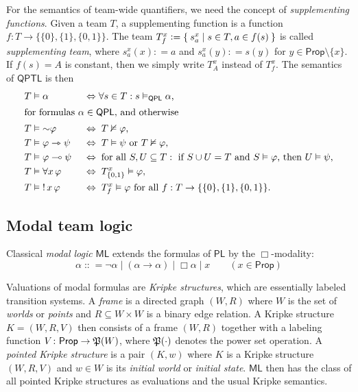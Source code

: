 \documentclass[a4paper,english,fleqn,11pt,final]{scrartcl}
\newcommand{\pow}[1]{{\protect\ensuremath{\mathord{\mathfrak{P}(\nobreak#1\nobreak)}}}}
\newcommand{\negg}{{\sim}}
\newcommand{\logic}[1]{\ensuremath{\mathsf{#1}}\xspace}
\newcommand{\PS}{\logic{Prop}}
\newcommand{\PL}{\logic{PL}}
\newcommand{\QPL}{\logic{QPL}}
\newcommand{\ML}{\logic{ML}}
\newcommand{\QPTL}{\logic{QPTL}}
\providecommand{\dfn}{\mathrel{\mathop:}=}
\providecommand{\ddfn}{\mathrel{\mathop{{\mathop:}{\mathop:}}}=}
\newcommand{\imp}{\rightarrow}
\newcommand{\limp}{\multimap}
\newcommand{\timp}{\rightarrowtriangle}
\DeclareMathOperator{\shriek}{!}
\theoremstyle{plain}
\theoremstyle{definition}
\begin{document}
For the semantics of team-wide quantifiers, we need the concept of \emph{supplementing functions}.
Given a team $T$, a supplementing function is a function $f \colon T \to \{\{0\},\{1\},\{0,1\}\}$.
The team $T^x_f \dfn \Set{ s^x_a | s \in T, a \in f(s)}$ is called \emph{supplementing team},
where $s^x_a(x) \dfn a$ and $s^x_a(y) \dfn s(y)$ for $y \in \PS \setminus \{ x\}$.
If $f(s) = A$ is constant, then we simply write $T^x_A$ instead of $T^x_f$.
\label{p:semantics}
The semantics of $\QPTL$ is then
\begin{alignat*}{2}
    &T \vDash \alpha&& \Leftrightarrow \forall s \in T : s \vDash_{\QPL} \alpha\text{,}\\
\intertext{for formulas $\alpha \in \QPL$, and otherwise}
    &T \vDash \negg\varphi&&\Leftrightarrow\; T \nvDash \varphi\text{,}\\
    &T \vDash \varphi \timp \psi&&\Leftrightarrow\; T \vDash \psi \text{ or }T\nvDash \varphi\text{,}\\
    &T \vDash \varphi \limp \psi\;&&\Leftrightarrow\; \text{for all } S, U \subseteq T : \text{ if }S \cup U = T \text{ and }S \vDash \varphi \text{, then }U \vDash \psi\text{,}\\
    &T \vDash \forall x \,\varphi &&\Leftrightarrow\; T^x_{\{0,1\}} \vDash \varphi \text{,}\\
    &T \vDash \shriek x \, \varphi &&\Leftrightarrow\; T^x_{f} \vDash \varphi \text{ for all  }f : T \to \{\{0\},\{1\},\{0,1\}\}\text{.}
\end{alignat*}

\subsection{Modal team logic}

Classical \emph{modal logic} $\ML$ extends the formulas of $\PL$ by the $\Box$-modality:
\[
\alpha \ddfn \neg \alpha \mid (\alpha \imp \alpha) \mid \Box \alpha \mid x \qquad (x \in \PS)
\]


Valuations of modal formulas are \emph{Kripke structures}, which are essentially labeled transition systems.
A \emph{frame} is a directed graph $(W, R)$ where $W$ is the set of \emph{worlds} or \emph{points} and $R \subseteq W \times W$ is a binary edge relation.
A Kripke structure $K = (W,R,V)$ then consists of a frame $(W,R)$ together with a labeling function $V \colon \PS \to \pow{W}$, where $\pow{\cdot}$ denotes the power set operation.
A \emph{pointed Kripke structure} is a pair $(K,w)$ where $K$ is a Kripke structure $(W,R,V)$ and $w \in W$ is its \emph{initial world} or \emph{initial state}.
$\ML$ then has the class of all pointed Kripke structures as evaluations and the usual Kripke semantics.
\end{document}
